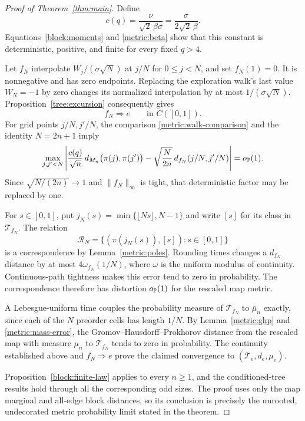 \begin{proof}[Proof of Theorem~\ref{thm:main}]
Define
\begin{equation}\label{metric:constant}
 c(q)=\frac{\nu}{\sqrt2\,\beta\sigma}
     =\frac{\sigma}{2\sqrt2\,\beta}.
\end{equation}
Equations~\eqref{block:moments} and \eqref{metric:beta} show that this
constant is deterministic, positive, and finite for every fixed $q>4$.

Let $f_N$ interpolate $W_j/(\sigma\sqrt N)$ at $j/N$ for
$0\le j<N$, and set $f_N(1)=0$. It is nonnegative and has zero
endpoints. Replacing the exploration walk's last value
$W_N=-1$ by zero changes its normalized interpolation by at most
$1/(\sigma\sqrt N)$. Proposition~\ref{tree:excursion} consequently gives
\[
 f_N\Longrightarrow e
 \qquad\text{in }C([0,1]).
\]
For grid points $j/N,j'/N$, the comparison
\eqref{metric:walk-comparison} and the identity $N=2n+1$ imply
\[
 \max_{j,j'<N}
 \left|
  \frac{c(q)}{\sqrt n}\,
     d_{M_n}\big(\pi(j),\pi(j')\big)
  -\sqrt{\frac{N}{2n}}\,
     d_{f_N}(j/N,j'/N)
 \right|=o_{\mathbb P}(1).
\]
Since $\sqrt{N/(2n)}\to1$ and $\|f_N\|_\infty$ is tight, that
deterministic factor may be replaced by one.

For $s\in[0,1]$, put $j_N(s)=\min\{\lfloor Ns\rfloor,N-1\}$ and
write $[s]$ for its class in $\mathcal T_{f_N}$. The relation
\[
 \mathcal R_N=\{(\pi(j_N(s)),[s]):s\in[0,1]\}
\]
is a correspondence by Lemma~\ref{metric:poles}.
Rounding times changes a $d_{f_N}$ distance by at most
$4\omega_{f_N}(1/N)$, where $\omega$ is the uniform modulus of
continuity. Continuous-path tightness makes this error tend to zero
in probability. The correspondence therefore has distortion
$o_{\mathbb P}(1)$ for the rescaled map metric.

A Lebesgue-uniform time couples the probability measure of
$\mathcal T_{f_N}$ to $\bar\mu_n$ exactly, since each of the $N$
preorder cells has length $1/N$. By
Lemma~\ref{metric:ghp} and \eqref{metric:mass-error}, the
Gromov--Hausdorff--Prokhorov distance from the rescaled map with
measure $\mu_n$ to $\mathcal T_{f_N}$ tends to zero in probability.
The continuity established above and $f_N\Longrightarrow e$ prove
the claimed convergence to $(\mathcal T_e,d_e,\mu_e)$.

Proposition~\ref{block:finite-law} applies to every $n\ge1$, and
the conditioned-tree results hold through all the corresponding
odd sizes. The proof uses only the map marginal and all-edge
block distances, so its conclusion is precisely the unrooted,
undecorated metric probability limit stated in the theorem.
\end{proof}
